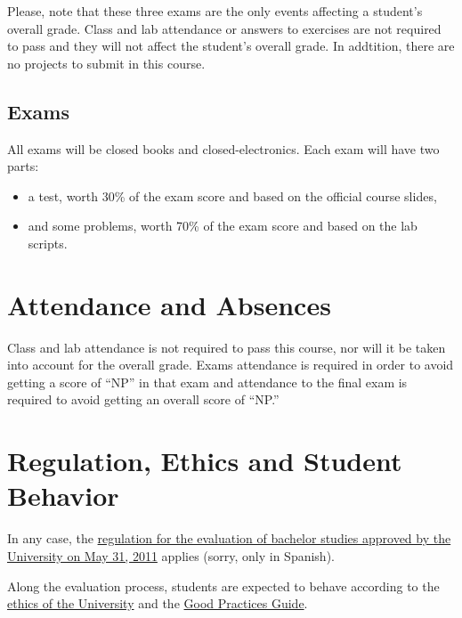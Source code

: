 \documentclass[11pt, a4paper, twoside]{article}
\begin{document}
Please, note that these three exams are the only events affecting a student's
overall grade. Class and lab attendance or answers to exercises are not
required to pass and they will not affect the student's overall grade.  In
addtition, there are no projects to submit in this course.

\subsection{Exams}

All exams will be closed books and closed-electronics. Each exam will have two
parts:

\begin{itemize}

  \item a test, worth 30\% of the exam score and based on the official course
    slides,

  \item and some problems, worth 70\% of the exam score and based on the lab
    scripts.

\end{itemize}

\section{Attendance and Absences}

Class and lab attendance is not required to pass this course, nor will it be
taken into account for the overall grade. Exams attendance is required in order
to avoid getting a score of ``NP'' in that exam and attendance to the final
exam is required to avoid getting an overall score of ``NP.''

\section{Regulation, Ethics and Student Behavior}

In any case, the
\href{http://www.uc3m.es/portal/page/portal/organizacion/secret_general/normativa/estudiantes/estudios_grado/normativa-evaluacion-continua-31-05-11_FINALx.pdf}{regulation
  for the evaluation of bachelor studies approved by the University on May 31,
2011} applies (sorry, only in Spanish).

Along the evaluation process, students are expected to behave according to the
\href{http://www.uc3m.es/portal/page/portal/conocenos/nuestros_estudios/grados/tu_compromiso_universidad}{ethics
of the University} and the
\href{http://www.uc3m.es/ss/Satellite/UC3MInstitucional/en/TextoMixta/1371206782958/Guia_de_las_buenas_practicas}{Good
Practices Guide}.
\end{document}
